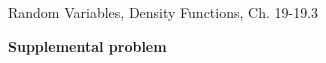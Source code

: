 \documentclass[handout]{mcs}
\begin{document}

\begin{staffnotes}
Random Variables, Density Functions, Ch. 19-19.3

\end{staffnotes}








\vspace{20mm}
\begin{center}
\textbf{\large Supplemental problem}
\end{center}









\end{document}
